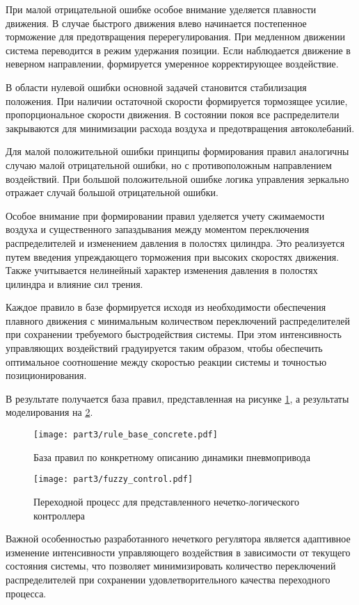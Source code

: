 При малой отрицательной ошибке особое внимание уделяется
плавности движения. В случае быстрого движения влево начинается
постепенное торможение для предотвращения перерегулирования.
При медленном движении система переводится в режим удержания
позиции. Если наблюдается движение в неверном направлении,
формируется умеренное корректирующее воздействие.

В области нулевой ошибки основной задачей становится стабилизация
положения. При наличии остаточной скорости формируется тормозящее
усилие, пропорциональное скорости движения. В состоянии покоя все
распределители закрываются для минимизации расхода воздуха и
предотвращения автоколебаний.

Для малой положительной ошибки принципы формирования правил
аналогичны случаю малой отрицательной ошибки, но с противоположным
направлением воздействий. При большой положительной ошибке
логика управления зеркально отражает случай большой отрицательной ошибки.

Особое внимание при формировании правил уделяется учету сжимаемости
воздуха и существенного запаздывания между моментом переключения
распределителей и изменением давления в полостях цилиндра. Это
реализуется путем введения упреждающего торможения при высоких
скоростях движения. Также учитывается нелинейный характер изменения
давления в полостях цилиндра и влияние сил трения.

Каждое правило в базе формируется исходя из необходимости
обеспечения плавного движения с минимальным количеством
переключений распределителей при сохранении требуемого
быстродействия системы. При этом интенсивность управляющих
воздействий градуируется таким образом, чтобы обеспечить
оптимальное соотношение между скоростью реакции системы и
точностью позиционирования.

В результате получается база правил, представленная на рисунке \ref{fig:concrette_fuzzy_rules}, а результаты моделирования на \ref{fig:fuzzy_transient}.

\begin{figure}[ht]
	\centering
	\texttt{[image: part3/rule\_base\_concrete.pdf]}
	\caption{База правил по конкретному описанию динамики пневмопривода}
	\label{fig:concrette_fuzzy_rules}
\end{figure}

\begin{figure}[ht]
	\centering
	\texttt{[image: part3/fuzzy\_control.pdf]}
	\caption{Переходной процесс для представленного нечетко-логического контроллера }
	\label{fig:fuzzy_transient}
\end{figure}

Важной особенностью разработанного нечеткого регулятора является адаптивное изменение интенсивности управляющего
воздействия в зависимости от текущего состояния системы, что позволяет минимизировать количество переключений распределителей при
сохранении удовлетворительного качества переходного процесса.

